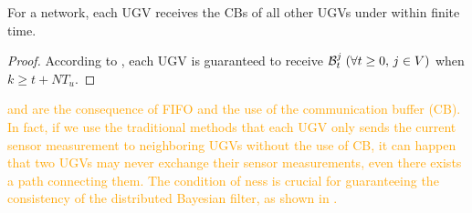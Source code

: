 	

	\begin{cor}\label{cor1}
		For a {\fc} network, each UGV receives the CBs of all other UGVs under {\proto} within finite time. 
	\end{cor}
	\begin{proof}
		According to ,
		each UGV is guaranteed to receive $\mathcal{B}^j_t\; (\forall t\ge 0,\, j\in V)$ when \small$k\geq t+NT_u$\normalsize.
		
	\end{proof}
	
	\begin{rem}
		\textcolor{orange}{
		 and  are the consequence of FIFO and the use of the communication buffer (CB). 
		In fact, if we use the traditional methods that each UGV only sends the current sensor measurement to neighboring UGVs without the use of CB, it can happen that two UGVs may never exchange their sensor measurements, even there exists a path connecting them.
		The condition of \fc ness is crucial for guaranteeing the consistency of the distributed Bayesian filter, as shown in .
	}
	\end{rem}
	
	
	
